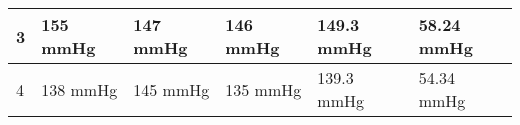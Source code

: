 \begin{table}[H]
\begin{tabular}{|l|l|l|l|l|l|}
		3                                                        & 155 mmHg                                                      & 147 mmHg                                                      & 146 mmHg                                                       & 149.3 mmHg                                             & 58.24 mmHg                                             \\ \hline
		4                                                        & 138 mmHg                                                      & 145 mmHg                                                      & 135 mmHg                                                       & 139.3 mmHg                                             & 54.34 mmHg                                             \\ \hline
	\end{tabular}
\end{table}